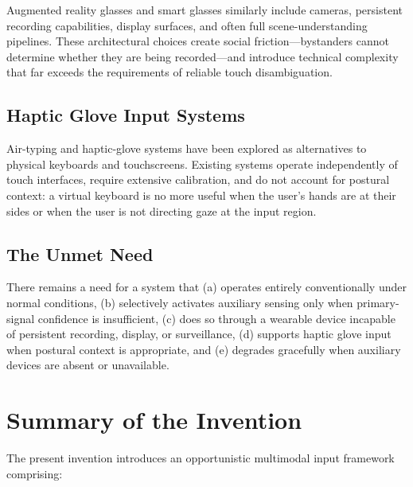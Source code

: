 \documentclass[11pt,letterpaper]{article}
\begin{document}
Augmented reality glasses and smart glasses similarly include cameras, persistent
recording capabilities, display surfaces, and often full scene-understanding pipelines.
These architectural choices create social friction---bystanders cannot determine whether
they are being recorded---and introduce technical complexity that far exceeds the
requirements of reliable touch disambiguation.

\subsection{Haptic Glove Input Systems}

Air-typing and haptic-glove systems have been explored as alternatives to physical
keyboards and touchscreens. Existing systems operate independently of touch interfaces,
require extensive calibration, and do not account for postural context: a virtual
keyboard is no more useful when the user's hands are at their sides or when the user
is not directing gaze at the input region.

\subsection{The Unmet Need}

There remains a need for a system that (a) operates entirely conventionally under
normal conditions, (b) selectively activates auxiliary sensing only when primary-signal
confidence is insufficient, (c) does so through a wearable device incapable of
persistent recording, display, or surveillance, (d) supports haptic glove input when
postural context is appropriate, and (e) degrades gracefully when auxiliary devices
are absent or unavailable.

\section{Summary of the Invention}

The present invention introduces an opportunistic multimodal input framework comprising:
\end{document}

